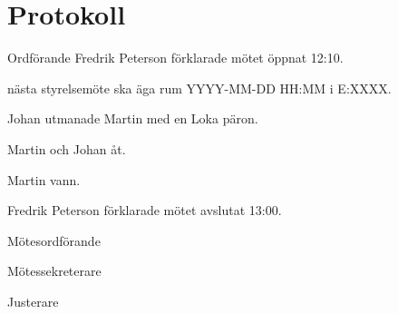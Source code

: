 \documentclass[10pt]{article}
\def\mo{Fredrik Peterson}
\def\ms{Erik Månsson}
\def\ji{}
\begin{document}
\section*{Protokoll}
\begin{paragrafer}
Ordförande {\mo} förklarade mötet öppnat 12:10.

\valavmo

\valavms

\tosg

\ingaadj


\valavj



\begin{fyllnadsval} %
\end{fyllnadsval}

\begin{paragrafer}



\end{paragrafer}


\Mba nästa styrelsemöte ska äga rum YYYY-MM-DD HH:MM i E:XXXX.

\Ibfu


Johan utmanade Martin med en Loka päron.

Martin och Johan åt.

Martin vann.

{\mo} förklarade mötet avslutat 13:00.

\end{paragrafer}

\hidesignfoot
\begin{signatures}{3}
\signature{\mo}{Mötesordförande}
\signature{\ms}{Mötessekreterare}
\signature{\ji}{Justerare}
\end{signatures}
\end{document}
